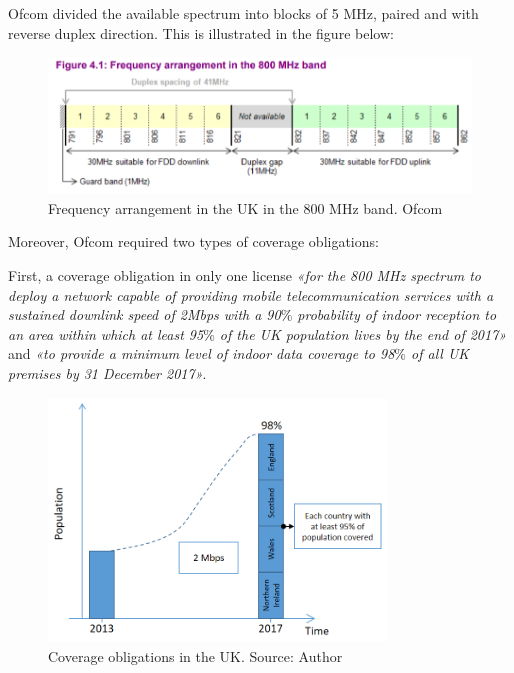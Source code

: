 {Ofcom divided the available spectrum into blocks of 5 MHz, paired and with reverse duplex direction. This is illustrated in the figure below:




\begin{figure}[H]
	\begin{Center}
		\includegraphics[width=1.00\textwidth]{./media/image10.png}
		\caption{Frequency arrangement in the UK in the 800 MHz band. Ofcom\cite{2-13}}
	\end{Center}
\end{figure}



Moreover, Ofcom required two types of coverage obligations:\par

First, a coverage obligation in only one license \textit{«for the 800 MHz spectrum to deploy a network capable of providing mobile telecommunication services with a sustained downlink speed of 2Mbps with a 90$\%$  probability of indoor reception to an area within which at least 95$\%$  of the UK population lives by the end of 2017»} and\textit{ «to provide a minimum level of indoor data coverage to 98$\%$  of all UK premises by 31 December 2017»}.




\begin{figure}[H]
	\begin{Center}
		\includegraphics[width=0.80\textwidth]{./media/image11.png}
		\caption{Coverage obligations in the UK. Source: Author}
	\end{Center}
\end{figure}


}

